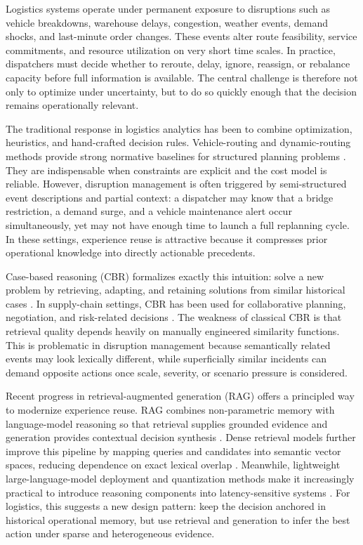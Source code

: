 \documentclass[conference]{IEEEtran}
\begin{document}
Logistics systems operate under permanent exposure to disruptions such as vehicle breakdowns, warehouse delays, congestion, weather events, demand shocks, and last-minute order changes. These events alter route feasibility, service commitments, and resource utilization on very short time scales. In practice, dispatchers must decide whether to reroute, delay, ignore, reassign, or rebalance capacity before full information is available. The central challenge is therefore not only to optimize under uncertainty, but to do so quickly enough that the decision remains operationally relevant.

The traditional response in logistics analytics has been to combine optimization, heuristics, and hand-crafted decision rules. Vehicle-routing and dynamic-routing methods provide strong normative baselines for structured planning problems \cite{toth2014vrp,pillac2013dvrp}. They are indispensable when constraints are explicit and the cost model is reliable. However, disruption management is often triggered by semi-structured event descriptions and partial context: a dispatcher may know that a bridge restriction, a demand surge, and a vehicle maintenance alert occur simultaneously, yet may not have enough time to launch a full replanning cycle. In these settings, experience reuse is attractive because it compresses prior operational knowledge into directly actionable precedents.

Case-based reasoning (CBR) formalizes exactly this intuition: solve a new problem by retrieving, adapting, and retaining solutions from similar historical cases \cite{aamodt1994cbr,watson1999cbr}. In supply-chain settings, CBR has been used for collaborative planning, negotiation, and risk-related decisions \cite{kwon2007mace,fang2010hybrid,giannakis2011risk}. The weakness of classical CBR is that retrieval quality depends heavily on manually engineered similarity functions. This is problematic in disruption management because semantically related events may look lexically different, while superficially similar incidents can demand opposite actions once scale, severity, or scenario pressure is considered.

Recent progress in retrieval-augmented generation (RAG) offers a principled way to modernize experience reuse. RAG combines non-parametric memory with language-model reasoning so that retrieval supplies grounded evidence and generation provides contextual decision synthesis \cite{lewis2020rag}. Dense retrieval models further improve this pipeline by mapping queries and candidates into semantic vector spaces, reducing dependence on exact lexical overlap \cite{karpukhin2020dpr,reimers2019sbert,khattab2020colbert,santhanam2022colbertv2}. Meanwhile, lightweight large-language-model deployment and quantization methods make it increasingly practical to introduce reasoning components into latency-sensitive systems \cite{touvron2023llama,dettmers2023qlora,lin2024awq}. For logistics, this suggests a new design pattern: keep the decision anchored in historical operational memory, but use retrieval and generation to infer the best action under sparse and heterogeneous evidence.
\end{document}
